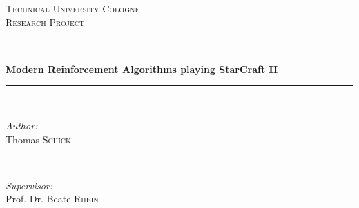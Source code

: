 \begin{titlepage}

    \newcommand{\HRule}{\rule{\linewidth}{0.5mm}} %
    
    \center %
    
    \begin{flushright}
    \end{flushright}
    \vspace{1.5cm}
    
    \textsc{\LARGE Technical University Cologne}\\[1.5cm] %
    \textsc{\Large Research Project}\\[0.5cm] %
    
    
    \HRule \\[0.4cm]
    { \huge \bfseries
       Modern Reinforcement Algorithms playing StarCraft II }\\[0.4cm] %
    \HRule \\[1.5cm]
     
    
    \begin{minipage}{0.4\textwidth}
    \begin{flushleft} \large
    \emph{Author:}\\
    Thomas \textsc{Schick\\} %
    \end{flushleft}
    \end{minipage}
    ~
    \begin{minipage}{0.4\textwidth}
    \begin{flushright} \large
    \emph{
    Supervisor:} \\
    Prof. Dr. Beate \textsc{Rhein} \\ %
    \end{flushright}
    \end{minipage}\\[9cm]
    

\end{titlepage}
